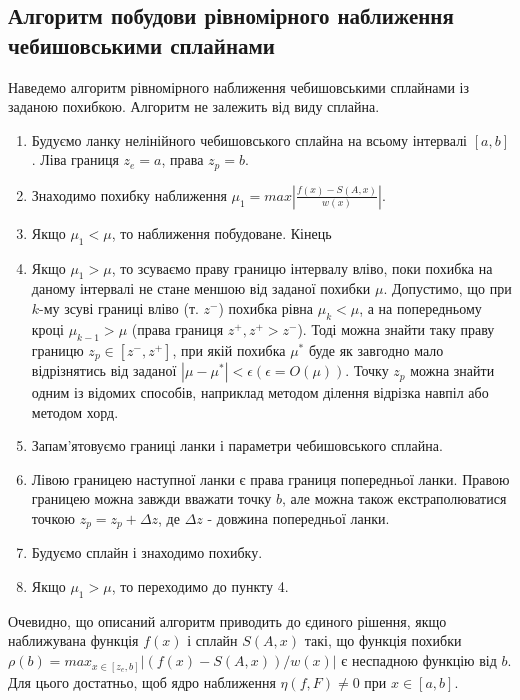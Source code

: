 \documentclass[ukrainian,14pt]{extarticle}
\begin{document}
\subsection{Алгоритм побудови рівномірного наближення чебишовськими сплайнами}
Наведемо алгоритм рівномірного наближення чебишовськими сплайнами із заданою похибкою. Алгоритм не залежить від виду сплайна.
\begin{enumerate}

\item Будуємо ланку нелінійного чебишовського сплайна на всьому інтервалі $[a,b]$. Ліва границя $z_e = a$, права $z_p = b$.
\item Знаходимо похибку наближення $\mu_1 = max \left|\frac{f(x) - S(A, x)}{w(x)}\right|.$
\item Якщо $\mu_1 < \mu$, то наближення побудоване. Кінець
\item Якщо $\mu_1 > \mu$, то зсуваємо праву границю інтервалу вліво, поки похибка на даному інтервалі не стане меншою від заданої похибки $\mu$. Допустимо, що при $k$-му зсуві границі вліво (т. $z^-$) похибка рівна $\mu_k < \mu$, а на попередньому кроці $\mu_{k-1} > \mu$ (права границя $z^+, z^+ > z^-$). Тоді можна знайти таку праву границю $z_p \in [z^-, z^+]$, при якій похибка $\mu^*$ буде як завгодно мало відрізнятись від заданої $|\mu - \mu^*| < \epsilon (\epsilon = O(\mu)).$ Точку $z_p$ можна знайти одним із відомих способів, наприклад методом ділення відрізка навпіл або методом хорд.
\item Запам'ятовуємо границі ланки і параметри чебишовського сплайна.
\item Лівою границею наступної ланки є права границя попередньої ланки. Правою границею можна завжди вважати точку $b$, але можна також екстраполюватися точкою $z_p = z_p + \Delta z$, де $\Delta z$ - довжина попередньої ланки.
\item Будуємо сплайн і знаходимо похибку.
\item Якщо $\mu_1 > \mu$, то переходимо до пункту 4.
%
\end{enumerate}

Очевидно, що описаний алгоритм приводить до єдиного рішення, якщо наближувана функція $f(x)$ і сплайн $S(A, x)$ такі, що функція похибки $\rho(b) = max_{x \in [z_e, b]} |(f(x) - S(A, x))/w(x)|$ є неспадною функцію від $b$. Для цього достатньо, щоб ядро наближення $\eta(f, F) \neq 0$ при $x \in [a, b]$.
\end{document}

